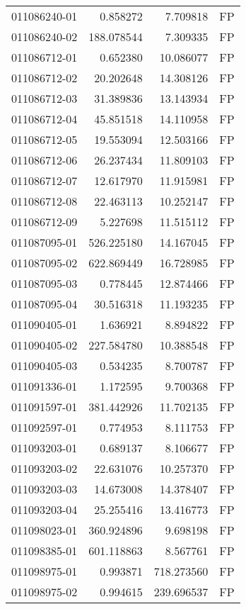 \begin{tabular}{lrrl}
011086240-01 &    0.858272 &     7.709818 &   FP \\
011086240-02 &  188.078544 &     7.309335 &   FP \\
011086712-01 &    0.652380 &    10.086077 &   FP \\
011086712-02 &   20.202648 &    14.308126 &   FP \\
011086712-03 &   31.389836 &    13.143934 &   FP \\
011086712-04 &   45.851518 &    14.110958 &   FP \\
011086712-05 &   19.553094 &    12.503166 &   FP \\
011086712-06 &   26.237434 &    11.809103 &   FP \\
011086712-07 &   12.617970 &    11.915981 &   FP \\
011086712-08 &   22.463113 &    10.252147 &   FP \\
011086712-09 &    5.227698 &    11.515112 &   FP \\
011087095-01 &  526.225180 &    14.167045 &   FP \\
011087095-02 &  622.869449 &    16.728985 &   FP \\
011087095-03 &    0.778445 &    12.874466 &   FP \\
011087095-04 &   30.516318 &    11.193235 &   FP \\
011090405-01 &    1.636921 &     8.894822 &   FP \\
011090405-02 &  227.584780 &    10.388548 &   FP \\
011090405-03 &    0.534235 &     8.700787 &   FP \\
011091336-01 &    1.172595 &     9.700368 &   FP \\
011091597-01 &  381.442926 &    11.702135 &   FP \\
011092597-01 &    0.774953 &     8.111753 &   FP \\
011093203-01 &    0.689137 &     8.106677 &   FP \\
011093203-02 &   22.631076 &    10.257370 &   FP \\
011093203-03 &   14.673008 &    14.378407 &   FP \\
011093203-04 &   25.255416 &    13.416773 &   FP \\
011098023-01 &  360.924896 &     9.698198 &   FP \\
011098385-01 &  601.118863 &     8.567761 &   FP \\
011098975-01 &    0.993871 &   718.273560 &   FP \\
011098975-02 &    0.994615 &   239.696537 &   FP \\

\end{tabular}
